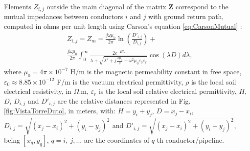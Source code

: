 \documentclass[conference]{IEEEtran}
\begin{document}
Elements $Z_{i,j}$ outside the main diagonal of the matrix $\mathbf{Z}$ correspond to the mutual impedances between conductors $i$ and $j$ with ground return path, computed in ohms per unit length using Carson's equation \eqref{eq:CarsonMutual} \cite{Carson1926}:
\begin{equation}\label{eq:CarsonMutual}
	\begin{aligned}
		&Z_{i,j}=Z_{m}= \frac{j\omega\mu_{0}}{2\pi}\ln\left(\frac{{D}'_{i,j}}{D_{i,j}}\right) + \\
		& \frac{j\omega\mu_{0}}{2\pi}\int_{0}^{\infty}\frac{2e^{-H\lambda}}{\lambda+\sqrt{\lambda^2+j\frac{\omega\mu_{0}}{\rho}-\omega^2\mu_{0}\varepsilon_{0}\varepsilon_{r}}}\cos\left( \lambda D \right) d\lambda,
	\end{aligned}
\end{equation}
where $\mu_{0}=4\pi\times10^{-7}$ H/m is the magnetic permeability constant in free space, $\varepsilon_{0}\approx 8.85\times10^{-12}$ F/m is the vacuum electrical permittivity, $\rho$ is the local soil electrical resistivity, in $\Omega$.m, $\varepsilon_{r}$ is the local soil relative electrical permittivity, $H$, $D$, $D_{i,j}$ and ${D}'_{i,j}$ are the relative distances represented in Fig. \ref{fig:VistaTorreDuto}, in meters, with: $H=y_i+y_j$, $D=x_j-x_i$, $D_{i,j}=\sqrt{(x_j-x_i)^2+(y_i-y_j)^2}$ and $D'_{i,j}=\sqrt{(x_j-x_i)^2+(y_i+y_j)^2}$, being $[x_q,y_q]$, $q=i,~j,...$ are the coordinates of $q$-th conductor/pipeline.
\end{document}
